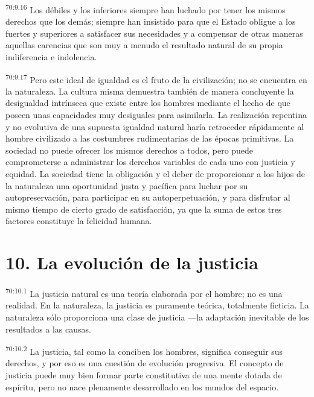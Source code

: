 \documentclass[twoside, 11pt]{book}
\begin{document}
\par
\textsuperscript{70:9.16} Los débiles y los inferiores siempre han luchado por tener los mismos derechos que los demás; siempre han insistido para que el Estado obligue a los fuertes y superiores a satisfacer sus necesidades y a compensar de otras maneras aquellas carencias que son muy a menudo el resultado natural de su propia indiferencia e indolencia.

\par
\textsuperscript{70:9.17} Pero este ideal de igualdad es el fruto de la civilización; no se encuentra en la naturaleza. La cultura misma demuestra también de manera concluyente la desigualdad intrínseca que existe entre los hombres mediante el hecho de que poseen unas capacidades muy desiguales para asimilarla. La realización repentina y no evolutiva de una supuesta igualdad natural haría retroceder rápidamente al hombre civilizado a las costumbres rudimentarias de las épocas primitivas. La sociedad no puede ofrecer los mismos derechos a todos, pero puede comprometerse a administrar los derechos variables de cada uno con justicia y equidad. La sociedad tiene la obligación y el deber de proporcionar a los hijos de la naturaleza una oportunidad justa y pacífica para luchar por su autopreservación, para participar en su autoperpetuación, y para disfrutar al mismo tiempo de cierto grado de satisfacción, ya que la suma de estos tres factores constituye la felicidad humana.

\section*{10. La evolución de la justicia}
\par
\textsuperscript{70:10.1} La justicia natural es una teoría elaborada por el hombre; no es una realidad. En la naturaleza, la justicia es puramente teórica, totalmente ficticia. La naturaleza sólo proporciona una clase de justicia ---la adaptación inevitable de los resultados a las causas.

\par
\textsuperscript{70:10.2} La justicia, tal como la conciben los hombres, significa conseguir sus derechos, y por eso es una cuestión de evolución progresiva. El concepto de justicia puede muy bien formar parte constitutiva de una mente dotada de espíritu, pero no nace plenamente desarrollado en los mundos del espacio.
\end{document}

